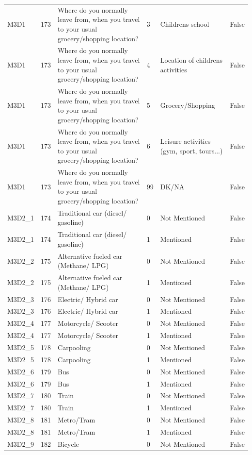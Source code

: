 \begin{tabular}{lrlllr}
M3D1 & 173 & Where do you normally leave from, when you travel to your usual grocery/shopping location? & 3 & Childrens school & False \\
M3D1 & 173 & Where do you normally leave from, when you travel to your usual grocery/shopping location? & 4 & Location of childrens activities & False \\
M3D1 & 173 & Where do you normally leave from, when you travel to your usual grocery/shopping location? & 5 & Grocery/Shopping & False \\
M3D1 & 173 & Where do you normally leave from, when you travel to your usual grocery/shopping location? & 6 & Leisure activities (gym, sport, tours...) & False \\
M3D1 & 173 & Where do you normally leave from, when you travel to your usual grocery/shopping location? & 99 & DK/NA & False \\
M3D2_1 & 174 & Traditional car (diesel/ gasoline) & 0 & Not Mentioned & False \\
M3D2_1 & 174 & Traditional car (diesel/ gasoline) & 1 & Mentioned & False \\
M3D2_2 & 175 & Alternative fueled car (Methane/ LPG) & 0 & Not Mentioned & False \\
M3D2_2 & 175 & Alternative fueled car (Methane/ LPG) & 1 & Mentioned & False \\
M3D2_3 & 176 & Electric/ Hybrid car & 0 & Not Mentioned & False \\
M3D2_3 & 176 & Electric/ Hybrid car & 1 & Mentioned & False \\
M3D2_4 & 177 & Motorcycle/ Scooter & 0 & Not Mentioned & False \\
M3D2_4 & 177 & Motorcycle/ Scooter & 1 & Mentioned & False \\
M3D2_5 & 178 & Carpooling & 0 & Not Mentioned & False \\
M3D2_5 & 178 & Carpooling & 1 & Mentioned & False \\
M3D2_6 & 179 & Bus & 0 & Not Mentioned & False \\
M3D2_6 & 179 & Bus & 1 & Mentioned & False \\
M3D2_7 & 180 & Train & 0 & Not Mentioned & False \\
M3D2_7 & 180 & Train & 1 & Mentioned & False \\
M3D2_8 & 181 & Metro/Tram & 0 & Not Mentioned & False \\
M3D2_8 & 181 & Metro/Tram & 1 & Mentioned & False \\
M3D2_9 & 182 & Bicycle & 0 & Not Mentioned & False \\

\end{tabular}
